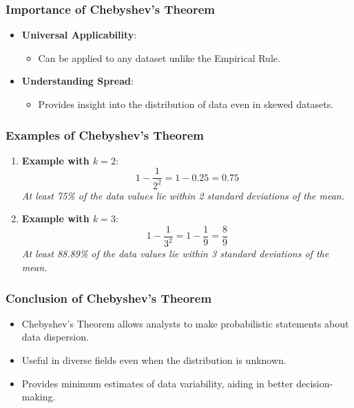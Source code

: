 \documentclass[aspectratio=169]{beamer}
\begin{document}
\begin{frame}[fragile]
    \frametitle{Importance of Chebyshev's Theorem}
    \begin{itemize}
        \item \textbf{Universal Applicability}: 
        \begin{itemize}
            \item Can be applied to any dataset unlike the Empirical Rule.
        \end{itemize}
        \item \textbf{Understanding Spread}: 
        \begin{itemize}
            \item Provides insight into the distribution of data even in skewed datasets.
        \end{itemize}
    \end{itemize}
\end{frame}

\begin{frame}[fragile]
    \frametitle{Examples of Chebyshev's Theorem}
    \begin{enumerate}
        \item \textbf{Example with \( k = 2 \)}:
        \[
        1 - \frac{1}{2^2} = 1 - 0.25 = 0.75
        \]
        \textit{At least 75\% of the data values lie within 2 standard deviations of the mean.}
        
        \item \textbf{Example with \( k = 3 \)}:
        \[
        1 - \frac{1}{3^2} = 1 - \frac{1}{9} = \frac{8}{9}
        \]
        \textit{At least 88.89\% of the data values lie within 3 standard deviations of the mean.}
    \end{enumerate}
\end{frame}

\begin{frame}[fragile]
    \frametitle{Conclusion of Chebyshev's Theorem}
    \begin{itemize}
        \item Chebyshev’s Theorem allows analysts to make probabilistic statements about data dispersion.
        \item Useful in diverse fields even when the distribution is unknown.
        \item Provides minimum estimates of data variability, aiding in better decision-making.
    \end{itemize}
\end{frame}
\end{document}
